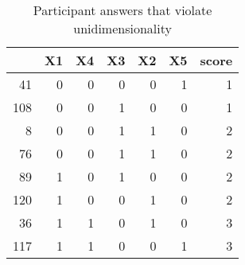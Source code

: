\begin{table}[ht]
\centering
\begin{tabular}{rrrrrrr}
  \toprule
 & X1 & X4 & X3 & X2 & X5 & score \\ 
  \midrule
41 & 0 & 0 & 0 & 0 & 1 & 1 \\ 
  108 & 0 & 0 & 1 & 0 & 0 & 1 \\ 
  8 & 0 & 0 & 1 & 1 & 0 & 2 \\ 
  76 & 0 & 0 & 1 & 1 & 0 & 2 \\ 
  89 & 1 & 0 & 1 & 0 & 0 & 2 \\ 
  120 & 1 & 0 & 0 & 1 & 0 & 2 \\ 
  36 & 1 & 1 & 0 & 1 & 0 & 3 \\ 
  117 & 1 & 1 & 0 & 0 & 1 & 3 \\ 
   \bottomrule
\end{tabular}
\caption{Participant answers that violate unidimensionality} 
\label{tab:viol}
\end{table}
